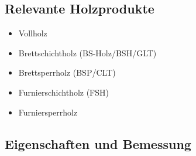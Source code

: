 \documentclass[fleqn,twoside]{article}
\begin{document}
    \subsection{Relevante Holzprodukte}
        \begin{itemize}
            \item Vollholz
            \item Brettschichtholz (BS-Holz/BSH/GLT)
            \item Brettsperrholz (BSP/CLT)
            \item Furnierschichtholz (FSH)
            \item Furniersperrholz
        \end{itemize}
    \subsection{Eigenschaften und Bemessung}
\end{document}
